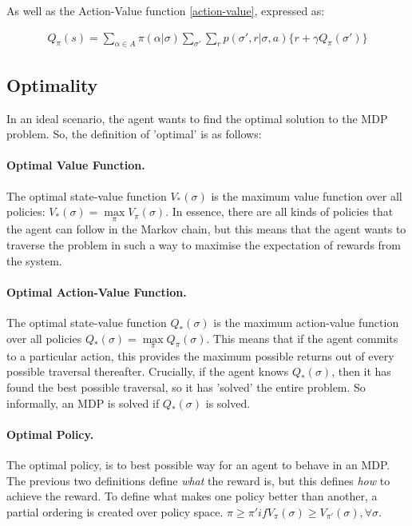 \documentclass[ %
                    author={Ashwinder Khurana},
                supervisor={Prof Dave Cliff},
                    degree={MEng},
                     title={The Deeply Reinforced Trader},
                  subtitle={},
                      type={enterprise},
                      year={2020} ]{dissertation}
\begin{document}
{\noindent
As well as the Action-Value function \ref{action-value}, expressed as:

\begin{equation}
\label{bellman}
\begin{split}
Q_\pi(s) = \sum\limits^{}_{\alpha \in A}{\pi(\alpha | \sigma)} \sum\limits^{}_{\sigma'}{\sum\limits^{}_{r}{p(\sigma' , r | \sigma, a) \{r + \gamma Q_\pi(\sigma')\}}}
\end{split}
\end{equation}
\vspace{0.5cm}

\subsection{Optimality}

In an ideal scenario, the agent wants to find the optimal solution to the MDP problem. So, the definition of 'optimal' is as follows:

\paragraph{Optimal Value Function.} The optimal state-value function $V_*(\sigma)$ is the maximum value function over all policies: $V_*(\sigma) = \max\limits_\pi V_\pi(\sigma)$. In essence, there are all kinds of policies that the agent can follow in the Markov chain, but this means that the agent wants to traverse the problem in such a way to maximise the expectation of rewards from the system. 
 
\paragraph{Optimal Action-Value Function.} The optimal state-value function $Q_*(\sigma)$ is the maximum action-value function over all policies $Q_*(\sigma) = \max\limits_\pi Q_\pi(\sigma)$. This means that if the agent commits to a particular action, this provides the maximum possible returns out of every possible traversal thereafter. Crucially, if the agent knows $Q_*(\sigma)$, then it has found the best possible traversal, so it has 'solved' the entire problem. So informally, an MDP is solved if  $Q_*(\sigma)$ is solved.

\paragraph{Optimal Policy.} The optimal policy, is to best possible way for an agent to behave in an MDP. The previous two definitions define \textit{what} the reward is, but this defines \textit{how} to achieve the reward. To define what makes one policy better than another, a partial ordering is created over policy space. $\pi \geq \pi'  if  V_\pi(\sigma) \geq V_{\pi'}(\sigma), \forall \sigma$. 

}
\end{document}
